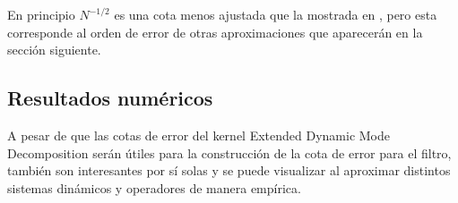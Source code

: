 	En principio $N^{-1/2}$ es una cota menos ajustada que la mostrada en \cite{Philipp2024ErrorOperator}, pero esta corresponde al orden de error de otras aproximaciones que aparecerán en la sección siguiente.


\subsection{Resultados numéricos}

A pesar de que las cotas de error del kernel Extended Dynamic Mode Decomposition serán útiles para la construcción de la cota de error para el filtro, también son interesantes por sí solas y se puede visualizar al aproximar distintos sistemas dinámicos y operadores de manera empírica.
